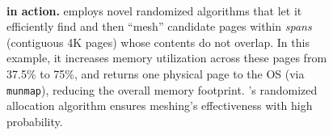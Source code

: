 

\begin{figure}[t!]
  \centering
  ~~~~~
  \centering

  \caption{\textbf{\Mesh{} in action.} \Mesh{} employs novel
    randomized algorithms that let it efficiently find and then
    ``mesh'' candidate pages within \emph{spans} (contiguous 4K pages)
    whose contents do not overlap.  In this example, it increases
    memory utilization across these pages from 37.5\% to 75\%, and
    returns one physical page to the OS (via \texttt{munmap}),
    reducing the overall memory footprint. \Mesh{}'s randomized
    allocation algorithm ensures meshing's effectiveness with high
    probability.}

  \label{fig:meshing}
\end{figure}


